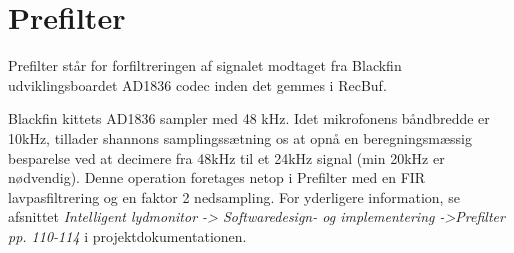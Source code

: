 \section{Prefilter}

Prefilter står for forfiltreringen af signalet modtaget fra Blackfin udviklingsboardet AD1836 codec inden det gemmes i RecBuf.

Blackfin kittets AD1836 sampler med 48 kHz. Idet mikrofonens båndbredde er 10kHz, tillader shannons samplingssætning os at opnå en beregningsmæssig besparelse ved at decimere fra 48kHz til et 24kHz signal (min 20kHz er nødvendig). Denne operation foretages netop i Prefilter med en FIR lavpasfiltrering og en faktor 2 nedsampling. For yderligere information, se afsnittet \textit{Intelligent lydmonitor -> Softwaredesign- og implementering ->Prefilter pp. 110-114} i projektdokumentationen. 